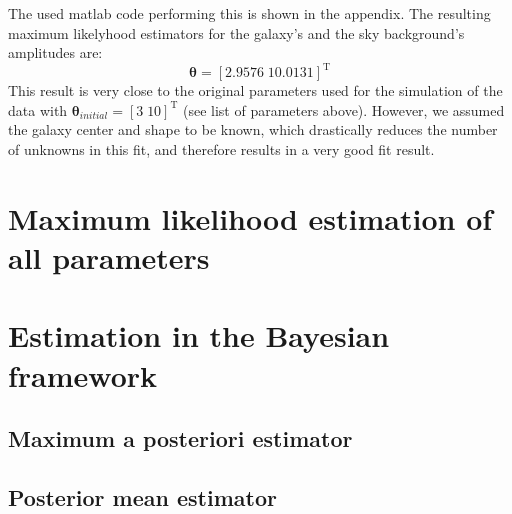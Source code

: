 The used matlab code performing this is shown in the appendix. The resulting maximum likelyhood estimators for the galaxy's and the sky background's amplitudes are:
\begin{equation*}
\boldsymbol{\theta}=\left[2.9576\;10.0131 \right]^{\mathrm{T}}
\end{equation*}
This result is very close to the original parameters used for the simulation of the data with $ \boldsymbol{\theta}_{initial}=\left[3\;10 \right]^{\mathrm{T}}$ (see list of parameters above). However, we assumed the galaxy center and shape to be known, which drastically reduces the number of unknowns in this fit, and therefore results in a very good fit result.

\section{Maximum likelihood estimation of all parameters}


\section{Estimation in the Bayesian framework}

\subsection{Maximum a posteriori estimator}

\subsection{Posterior mean estimator}


